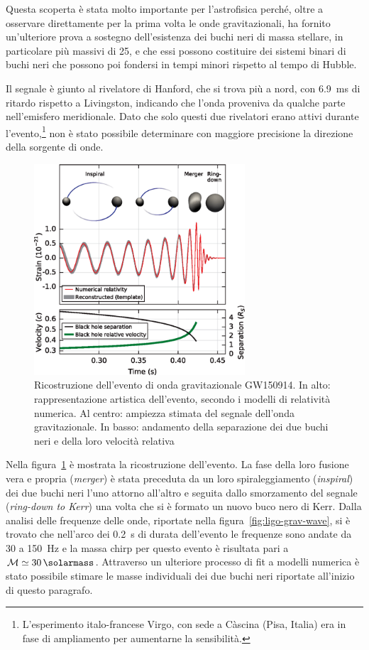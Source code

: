 Questa scoperta è stata molto importante per l'astrofisica perché, oltre a
osservare direttamente per la prima volta le onde gravitazionali, ha fornito
un'ulteriore prova a sostegno dell'esistenza dei buchi neri di massa stellare,
in particolare più massivi di \SI{25}{\solarmass}, e che essi possono costituire
dei sistemi binari di buchi neri che possono poi fondersi in tempi minori
rispetto al tempo di Hubble.

Il segnale è giunto al rivelatore di Hanford, che si trova più a nord, con
\SI{6.9}{\milli\second} di ritardo rispetto a Livingston, indicando che l'onda
proveniva da qualche parte nell'emisfero meridionale.  Dato che solo questi due
rivelatori erano attivi durante l'evento,\footnote{L'esperimento italo-francese
  Virgo, con sede a Càscina (Pisa, Italia) era in fase di ampliamento per
  aumentarne la sensibilità.} non è stato possibile determinare con maggiore
precisione la direzione della sorgente di onde.

\begin{figure}
  \centering
  \includegraphics[width=0.7\textwidth]{figure/ligo-estim-strain}
  \caption{Ricostruzione dell'evento di onda gravitazionale GW150914.  In alto:
    rappresentazione artistica dell'evento, secondo i modelli di relatività
    numerica.  Al centro: ampiezza stimata del segnale dell'onda gravitazionale.
    In basso: andamento della separazione dei due buchi neri e della loro
    velocità relativa}
  \label{fig:ligo-strain}
\end{figure}
Nella figura~\ref{fig:ligo-strain} è mostrata la ricostruzione dell'evento.  La
fase della loro fusione vera e propria (\emph{merger}) è stata preceduta da un
loro spiraleggiamento (\emph{inspiral}) dei due buchi neri l'uno attorno
all'altro e seguita dallo smorzamento del segnale (\emph{ring-down to Kerr}) una
volta che si è formato un nuovo buco nero di Kerr.  Dalla analisi delle
frequenze delle onde, riportate nella figura~\ref{fig:ligo-grav-wave}, si è
trovato che nell'arco dei \SI{0.2}{\second} di durata dell'evento le frequenze
sono andate da \num{30} a \SI{150}{\hertz} e la massa chirp per questo evento è
risultata pari a \(\mathcal{M} \simeq \SI{30}{\solarmass}\).  Attraverso un
ulteriore processo di fit a modelli numerica è stato possibile stimare le masse
individuali dei due buchi neri riportate all'inizio di questo paragrafo.

